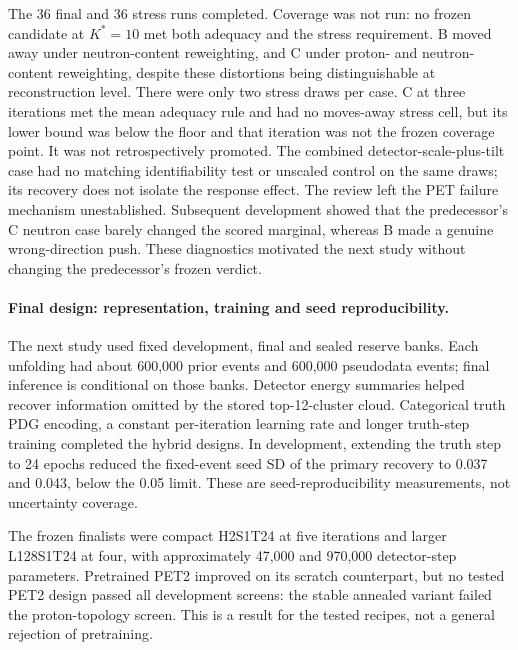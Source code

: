 The 36 final and 36 stress runs completed. Coverage was not run: no frozen candidate at $K^*=10$ met both adequacy and the stress requirement. B moved away under neutron-content reweighting, and C under proton- and neutron-content reweighting, despite these distortions being distinguishable at reconstruction level. There were only two stress draws per case. C at three iterations met the mean adequacy rule and had no moves-away stress cell, but its lower bound was below the floor and that iteration was not the frozen coverage point. It was not retrospectively promoted. The combined detector-scale-plus-tilt case had no matching identifiability test or unscaled control on the same draws; its recovery does not isolate the response effect. The review left the PET failure mechanism unestablished. Subsequent development showed that the predecessor's C neutron case barely changed the scored marginal, whereas B made a genuine wrong-direction push. These diagnostics motivated the next study without changing the predecessor's frozen verdict.

\paragraph{Final design: representation, training and seed reproducibility.} The next study used fixed development, final and sealed reserve banks. Each unfolding had about 600,000 prior events and 600,000 pseudodata events; final inference is conditional on those banks. Detector energy summaries helped recover information omitted by the stored top-12-cluster cloud. Categorical truth PDG encoding, a constant per-iteration learning rate and longer truth-step training completed the hybrid designs. In development, extending the truth step to 24 epochs reduced the fixed-event seed SD of the primary recovery to 0.037 and 0.043, below the 0.05 limit. These are seed-reproducibility measurements, not uncertainty coverage.

The frozen finalists were compact H2S1T24 at five iterations and larger L128S1T24 at four, with approximately 47,000 and 970,000 detector-step parameters. Pretrained PET2 improved on its scratch counterpart, but no tested PET2 design passed all development screens: the stable annealed variant failed the proton-topology screen. This is a result for the tested recipes, not a general rejection of pretraining.

